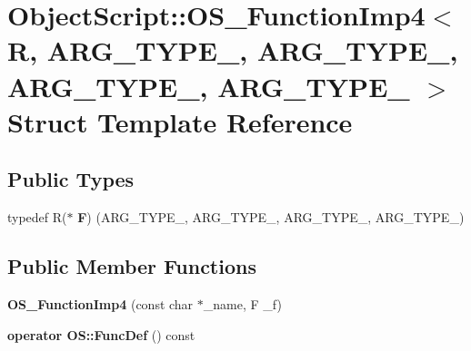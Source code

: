 \hypertarget{struct_object_script_1_1_o_s___function_imp4}{}\section{Object\+Script\+:\+:O\+S\+\_\+\+Function\+Imp4$<$ R, A\+R\+G\+\_\+\+T\+Y\+P\+E\+\_, A\+R\+G\+\_\+\+T\+Y\+P\+E\+\_, A\+R\+G\+\_\+\+T\+Y\+P\+E\+\_, A\+R\+G\+\_\+\+T\+Y\+P\+E\+\_ $>$ Struct Template Reference}
\label{struct_object_script_1_1_o_s___function_imp4}
\subsection*{Public Types}
\begin{DoxyCompactItemize}
\item 
typedef R($\ast$ {\bfseries F}) (A\+R\+G\+\_\+\+T\+Y\+P\+E\+\_, A\+R\+G\+\_\+\+T\+Y\+P\+E\+\_, A\+R\+G\+\_\+\+T\+Y\+P\+E\+\_, A\+R\+G\+\_\+\+T\+Y\+P\+E\+\_)\hypertarget{struct_object_script_1_1_o_s___function_imp4_add1783b531e7885a66aef7734d616577}{}\label{struct_object_script_1_1_o_s___function_imp4_add1783b531e7885a66aef7734d616577}

\end{DoxyCompactItemize}
\subsection*{Public Member Functions}
\begin{DoxyCompactItemize}
\item 
{\bfseries O\+S\+\_\+\+Function\+Imp4} (const char $\ast$\+\_\+name, F \+\_\+f)\hypertarget{struct_object_script_1_1_o_s___function_imp4_aa70096d4e9f0078e3f2ab7d9fa609330}{}\label{struct_object_script_1_1_o_s___function_imp4_aa70096d4e9f0078e3f2ab7d9fa609330}

\item 
{\bfseries operator O\+S\+::\+Func\+Def} () const \hypertarget{struct_object_script_1_1_o_s___function_imp4_a9e6e997305f9bff42e17604e610c7833}{}\label{struct_object_script_1_1_o_s___function_imp4_a9e6e997305f9bff42e17604e610c7833}

\end{DoxyCompactItemize}
